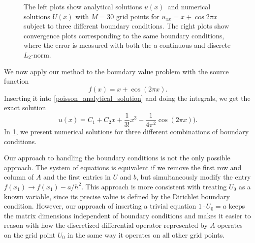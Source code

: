 \begin{figure}
	\caption{\label{poisson_numerical_solutions}
		The left plots show analytical solutions $u(x)$ and numerical solutions $U(x)$ with $M=30$ grid points for $u_{xx} = x + \cos{2 \pi x}$ subject to three different boundary conditions.
		The right plots show convergence plots corresponding to the same boundary conditions, where the error is measured with both the a continuous and discrete $L_2$-norm.
	}
\end{figure}

We now apply our method to the boundary value problem with the source function 
\begin{equation*}
f(x) = x + \cos(2 \pi x).
\end{equation*}
Inserting it into \cref{poisson_analytical_solution} and doing the integrals, we get the exact solution
\begin{equation*}
u(x) = C_1 + C_2 x + \frac{1}{3!}x^3 - \frac{1}{4 \pi^2}\cos(2 \pi x)).
\end{equation*}
In \cref{poisson_numerical_solutions}, we present numerical solutions for three different combinations of boundary conditions.

Our approach to handling the boundary conditions is not the only possible approach.
The system of equations is equivalent if we remove the first row and column of $A$ and the first entries in $U$ and $b$, but simultaneously modify the entry $f(x_1) \rightarrow f(x_1) - a/h^2$.
This approach is more consistent with treating $U_0$ as a known variable, since its precise value is defined by the Dirichlet boundary condition.
However, our approach of inserting a trivial equation $1 \cdot U_0 = a$ keeps the matrix dimensions independent of boundary conditions and makes it easier to reason with how the discretized differential operator represented by $A$ operates on the grid point $U_0$ in the same way it operates on all other grid points.

